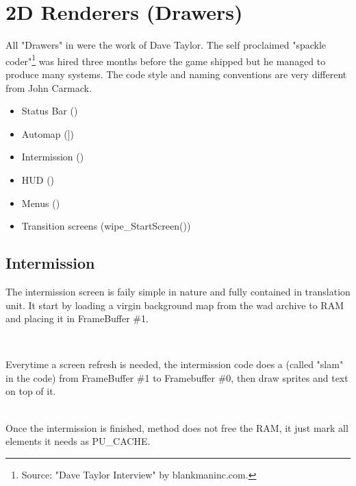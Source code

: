 
\section{2D Renderers (Drawers)}
All "Drawers" in \doom{}were the work of  Dave Taylor. The self proclaimed "spackle coder"\footnote{Source: "Dave Taylor Interview" by blankmaninc.com.} was hired three months before the game shipped but he managed to produce many systems. The code style and naming conventions are very different from John Carmack.
\begin{itemize}
\item Status Bar ()
\item Automap (])
\item Intermission ()
\item HUD ()
\item Menus ()
\item Transition screens (wipe\_StartScreen())
\end{itemize} 
\par




\subsection{Intermission}
The intermission screen is faily simple in nature and fully contained in  translation unit. It start by loading a virgin background map from the wad archive to RAM and placing it in FrameBuffer \#1.\\
\par
{}\\
\par
Everytime a screen refresh is needed, the intermission code does a  (called "slam" in the code) from FrameBuffer \#1 to Framebuffer \#0, then draw sprites and text on top of it.\\
\par
{}\\

Once the intermission is finished, method  does not free the RAM, it just mark all elements it needs as PU\_CACHE.\\





